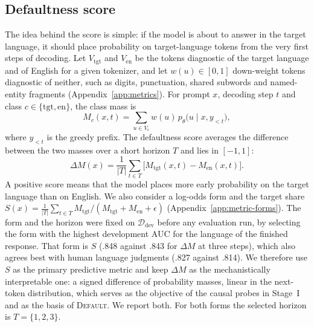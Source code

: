 \documentclass[11pt]{article}
\newcommand{\dM}{\ensuremath{\Delta M}\xspace}
\newcommand{\default}{\textsc{Default}\xspace}
\newcommand{\Ddev}{\ensuremath{\mathcal{D}_{\mathrm{dev}}}\xspace}
\begin{document}
\subsection{Defaultness score}
\label{subsec:metric}

The idea behind the score is simple: if the model is about to answer in the target language, it should place probability on target-language tokens from the very first steps of decoding. Let $V_{\mathrm{tgt}}$ and $V_{\mathrm{en}}$ be the tokens diagnostic of the target language and of English for a given tokenizer, and let $w(u)\in[0,1]$ down-weight tokens diagnostic of neither, such as digits, punctuation, shared subwords and named-entity fragments (Appendix~\ref{app:metrics}). For prompt $x$, decoding step $t$ and class $c\in\{\mathrm{tgt},\mathrm{en}\}$, the class mass is
\begin{equation}
M_c(x,t)=\sum_{u\in V_c} w(u)\,p_\theta\big(u \mid x, y_{<t}\big),
\label{eq:mass}
\end{equation}
where $y_{<t}$ is the greedy prefix. The defaultness score averages the difference between the two masses over a short horizon $T$ and lies in $[-1,1]$:
\begin{equation}
\Delta M(x)=\frac{1}{|T|}\sum_{t\in T}\big[M_{\mathrm{tgt}}(x,t)-M_{\mathrm{en}}(x,t)\big].
\label{eq:deltam}
\end{equation}
A positive score means that the model places more early probability on the target language than on English. We also consider a log-odds form and the target share $S(x)=\frac{1}{|T|}\sum_{t\in T}M_{\mathrm{tgt}}/(M_{\mathrm{tgt}}+M_{\mathrm{en}}+\epsilon)$ (Appendix~\ref{app:metric-forms}). The form and the horizon were fixed on \Ddev before any evaluation run, by selecting the form with the highest development AUC for the language of the finished response. That form is $S$ (.848 against .843 for \dM at three steps), which also agrees best with human language judgments (.827 against .814). We therefore use $S$ as the primary predictive metric and keep \dM as the mechanistically interpretable one: a signed difference of probability masses, linear in the next-token distribution, which serves as the objective of the causal probes in Stage~I and as the basis of \default. We report both. For both forms the selected horizon is $T=\{1,2,3\}$.
\end{document}
